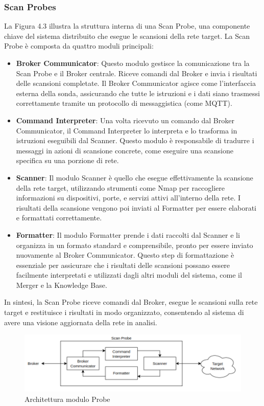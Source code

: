 \documentclass[target=bach,aauheader=,style=]{thud}
\begin{document}
\subsubsection{Scan Probes}
La Figura 4.3 illustra la struttura interna di una Scan Probe, una componente chiave del sistema distribuito che esegue le scansioni della rete target. La Scan Probe è composta da quattro moduli principali:
\begin{itemize}
  \item \textbf{Broker Communicator}: Questo modulo gestisce la comunicazione tra la Scan Probe e il Broker centrale. Riceve comandi dal Broker e invia i risultati delle scansioni completate. Il Broker Communicator agisce come l'interfaccia esterna della sonda, assicurando che tutte le istruzioni e i dati siano trasmessi correttamente tramite un protocollo di messaggistica (come MQTT).

  \item \textbf{Command Interpreter}: Una volta ricevuto un comando dal Broker Communicator, il Command Interpreter lo interpreta e lo trasforma in istruzioni eseguibili dal Scanner. Questo modulo è responsabile di tradurre i messaggi in azioni di scansione concrete, come eseguire una scansione specifica su una porzione di rete.

  \item \textbf{Scanner}: Il modulo Scanner è quello che esegue effettivamente la scansione della rete target, utilizzando strumenti come Nmap per raccogliere informazioni su dispositivi, porte, e servizi attivi all'interno della rete. I risultati della scansione vengono poi inviati al Formatter per essere elaborati e formattati correttamente.

  \item \textbf{Formatter}: Il modulo Formatter prende i dati raccolti dal Scanner e li organizza in un formato standard e comprensibile, pronto per essere inviato nuovamente al Broker Communicator. Questo step di formattazione è essenziale per assicurare che i risultati delle scansioni possano essere facilmente interpretati e utilizzati dagli altri moduli del sistema, come il Merger e la Knowledge Base.

\end{itemize}
In sintesi, la Scan Probe riceve comandi dal Broker, esegue le scansioni sulla rete target e restituisce i risultati in modo organizzato, consentendo al sistema di avere una visione aggiornata della rete in analisi.


\begin{figure}[t]
  \includegraphics[width=\columnwidth]{probe}
  \centering
  \caption{Architettura modulo Probe}
  \label{probe}
\end{figure}
\FloatBarrier
\end{document}
